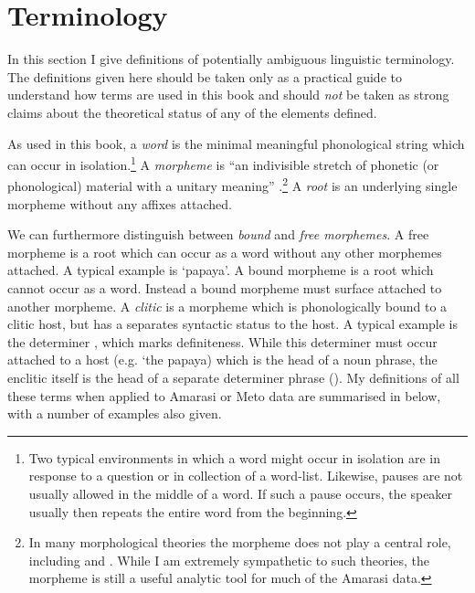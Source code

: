 \section{Terminology}\label{sec:Ter}
In this section I give definitions of potentially ambiguous linguistic terminology.
The definitions given here should be taken only as a practical guide
to understand how terms are used in this book
and should \emph{not} be taken as strong claims
about the theoretical status of any of the elements defined.

As used in this book, a \emph{word} is the minimal meaningful
phonological string which can occur in isolation.\footnote{
		Two typical environments in which a word might occur in isolation are
		in response to a question or in collection of a word-list.
		Likewise, pauses are not usually allowed in the middle of a word.
		If such a pause occurs, the speaker usually then repeats the entire word from the beginning.}
A \emph{morpheme} is ``an indivisible stretch of phonetic (or phonological)
material with a unitary meaning'' \citep[49]{an92}.\footnote{
		In many morphological theories the morpheme does not play a central role,
		including \cite{ma74,an92} and \cite{st01}.
		While I am extremely sympathetic to such theories,
		the morpheme is still a useful analytic tool for much of the Amarasi data.}
A \emph{root} is an underlying single morpheme without any affixes attached.

We can furthermore distinguish between \emph{bound} and \emph{free morphemes}.
A free morpheme is a root which can occur as a word without any other morphemes attached.
A typical example is  `papaya'.
A bound morpheme is a root which cannot occur as a word.
Instead a bound morpheme must surface attached to another morpheme.
A \emph{clitic} is a morpheme which is phonologically bound
to a clitic host, but has a separates syntactic status to the host.
A typical example is the determiner , which marks definiteness.
While this determiner must occur attached to a host (e.g.  `the papaya)
which is the head of a noun phrase, the enclitic itself 
is the head of a separate determiner phrase ().
My definitions of all these terms when applied to Amarasi or Meto data
are summarised in  below, with a number of examples also given.

